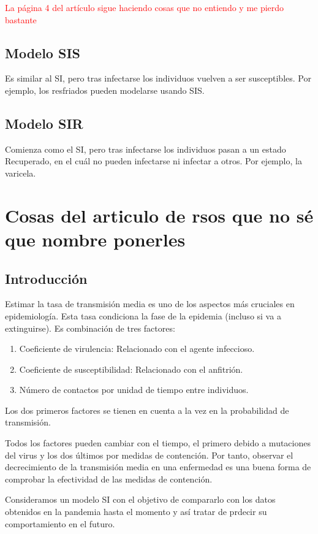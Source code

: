 \textcolor{red}{La página 4 del artículo sigue haciendo cosas que no entiendo y me pierdo bastante}


\subsection{Modelo SIS}
Es similar al SI, pero tras infectarse los individuos vuelven a ser susceptibles.
Por ejemplo, los resfriados pueden modelarse usando SIS.

\subsection{Modelo SIR}
Comienza como el SI, pero tras infectarse los individuos pasan a un estado Recuperado, en el cuál no pueden infectarse ni infectar a otros.
Por ejemplo, la varicela. 


\section{Cosas del articulo de rsos que no sé que nombre ponerles}

\subsection{Introducción}

Estimar la tasa de transmisión media es uno de los aspectos más cruciales en epidemiología. Esta tasa condiciona la fase de la epidemia (incluso si va a extinguirse). Es combinación de tres factores:

\begin{enumerate}
\item Coeficiente de virulencia: Relacionado con el agente infeccioso.
\item Coeficiente de susceptibilidad: Relacionado con el anfitrión.
\item Número de contactos por unidad de tiempo entre individuos.
\end{enumerate}

Los dos primeros factores se tienen en cuenta a la vez en la probabilidad de transmisión.

Todos los factores pueden cambiar con el tiempo, el primero debido a mutaciones del virus y los dos últimos por medidas de contención. Por tanto, observar el decrecimiento de la transmisión media en una enfermedad es una buena forma de comprobar la efectividad de las medidas de contención.

Consideramos un modelo SI con el objetivo de compararlo con los datos obtenidos en la pandemia hasta el momento y así tratar de prdecir su comportamiento en el futuro.

